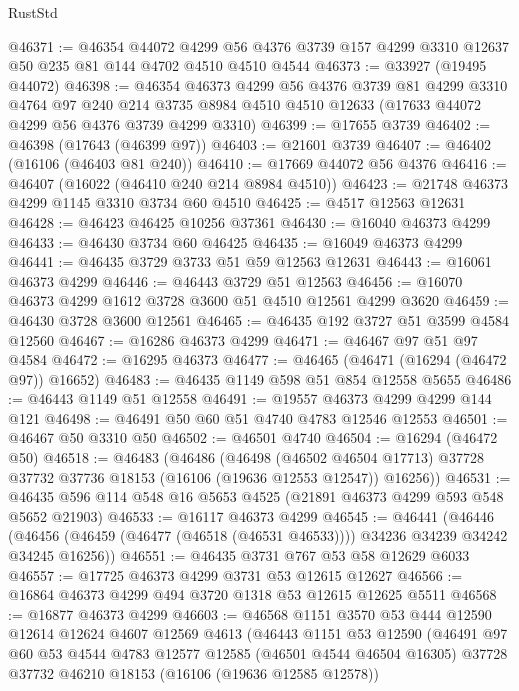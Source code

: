 \begin{lexlean}{RustStd}
\begin{coremodule}
@46371 := @46354
    @44072
    @4299
    @56
    @4376
    @3739
    @157
    @4299
    @3310
    @12637
    @50
    @235
    @81
    @144
    @4702
    @4510
    @4510
    @4544
@46373 := @33927 (@19495 @44072)
@46398 := @46354
    @46373
    @4299
    @56
    @4376
    @3739
    @81
    @4299
    @3310
    @4764
    @97
    @240
    @214
    @3735
    @8984
    @4510
    @4510
    @12633
    (@17633 @44072 @4299 @56 @4376 @3739 @4299 @3310)
@46399 := @17655 @3739
@46402 := @46398 (@17643 (@46399 @97))
@46403 := @21601 @3739
@46407 := @46402 (@16106 (@46403 @81 @240))
@46410 := @17669 @44072 @56 @4376
@46416 := @46407 (@16022 (@46410 @240 @214 @8984 @4510))
@46423 := @21748 @46373 @4299 @1145 @3310 @3734 @60 @4510
@46425 := @4517 @12563 @12631
@46428 := @46423 @46425 @10256 @37361
@46430 := @16040 @46373 @4299
@46433 := @46430 @3734 @60 @46425
@46435 := @16049 @46373 @4299
@46441 := @46435 @3729 @3733 @51 @59 @12563 @12631
@46443 := @16061 @46373 @4299
@46446 := @46443 @3729 @51 @12563
@46456 := @16070 @46373 @4299 @1612 @3728 @3600 @51 @4510 @12561 @4299 @3620
@46459 := @46430 @3728 @3600 @12561
@46465 := @46435 @192 @3727 @51 @3599 @4584 @12560
@46467 := @16286 @46373 @4299
@46471 := @46467 @97 @51 @97 @4584
@46472 := @16295 @46373
@46477 := @46465 (@46471 (@16294 (@46472 @97)) @16652)
@46483 := @46435 @1149 @598 @51 @854 @12558 @5655
@46486 := @46443 @1149 @51 @12558
@46491 := @19557 @46373 @4299 @4299 @144 @121
@46498 := @46491 @50 @60 @51 @4740 @4783 @12546 @12553
@46501 := @46467 @50 @3310 @50
@46502 := @46501 @4740
@46504 := @16294 (@46472 @50)
@46518 := @46483
    (@46486
      (@46498
        (@46502 @46504 @17713)
        @37728
        @37732
        @37736
        @18153
        (@16106 (@19636 @12553 @12547))
        @16256))
@46531 := @46435 @596 @114 @548 @16 @5653 @4525 (@21891 @46373 @4299 @593 @548 @5652 @21903)
@46533 := @16117 @46373 @4299
@46545 := @46441
    (@46446 (@46456 (@46459 (@46477 (@46518 (@46531 @46533)))) @34236 @34239 @34242 @34245 @16256))
@46551 := @46435 @3731 @767 @53 @58 @12629 @6033
@46557 := @17725 @46373 @4299 @3731 @53 @12615 @12627
@46566 := @16864 @46373 @4299 @494 @3720 @1318 @53 @12615 @12625 @5511
@46568 := @16877 @46373 @4299
@46603 := @46568
    @1151
    @3570
    @53
    @444
    @12590
    @12614
    @12624
    @4607
    @12569
    @4613
    (@46443
      @1151
      @53
      @12590
      (@46491
        @97
        @60
        @53
        @4544
        @4783
        @12577
        @12585
        (@46501 @4544 @46504 @16305)
        @37728
        @37732
        @46210
        @18153
        (@16106 (@19636 @12585 @12578))

\end{coremodule}
\end{lexlean}
